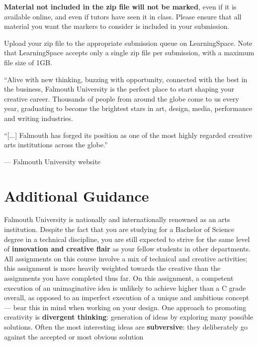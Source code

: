 \documentclass{../fal_assignment}
\begin{document}
\textbf{Material not included in the zip file will not be marked},
even if it is available online, and even if tutors have seen it in class.
Please ensure that all material you want the markers to consider is included in your submission.

Upload your zip file to the appropriate submission queue on LearningSpace.
Note that LearningSpace accepts only a single zip file per submission,
with a maximum file size of 1GB.

\begin{marginquote}
    ``Alive with new thinking, buzzing with opportunity, connected with the best in the business,
    Falmouth University is the perfect place to start shaping your creative career.
    Thousands of people from around the globe come to us every year,
    graduating to become the brightest stars in art, design, media, performance and writing industries.

    ``[...]
    Falmouth has forged its position as one of the most highly regarded creative arts institutions across the globe.''
    
    --- Falmouth University website
\end{marginquote}
\section*{Additional Guidance}

Falmouth University is nationally and internationally renowned as an arts institution.
Despite the fact that you are studying for a Bachelor of Science degree in a technical discipline,
you are still expected to strive for the same level of \textbf{innovation and creative flair}
as your fellow students in other departments.
All assignments on this course involve a mix of technical and creative activities;
this assignment is more heavily weighted towards the creative than the assignments you have completed thus far.
On this assignment, a competent execution of an unimaginative idea is unlikely to achieve higher than a C grade overall,
as opposed to an imperfect execution of a unique and ambitious concept
--- bear this in mind when working on your design.
One approach to promoting creativity is
\textbf{divergent thinking}: generation of ideas by exploring many possible solutions.
Often the most interesting ideas are \textbf{subversive}: they deliberately go against the
accepted or most obvious solution
\end{document}
